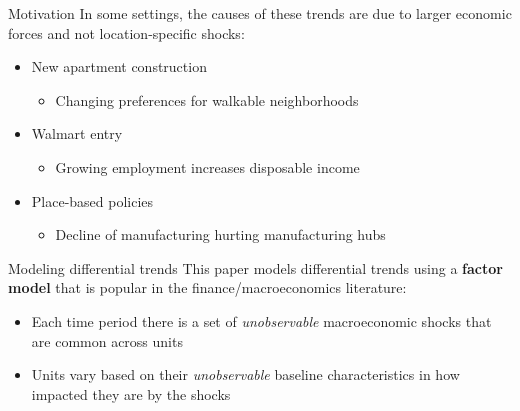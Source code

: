 \documentclass[aspectratio=169,t,11pt]{beamer}
\begin{document}
\begin{frame}{Motivation}
  In some settings, the causes of these trends are due to larger economic forces and not location-specific shocks:
  
  \begin{itemize}
    \item New apartment construction
    \begin{itemize}
      \item Changing preferences for walkable neighborhoods
    \end{itemize} 

    \pause
    \item Walmart entry
    \begin{itemize}
      \item Growing employment increases disposable income
    \end{itemize}

    \pause
    \item Place-based policies
    \begin{itemize}
      \item Decline of manufacturing hurting manufacturing hubs
    \end{itemize}
  \end{itemize}
\end{frame}

\begin{frame}{Modeling differential trends}
  This paper models differential trends using a \textbf{factor model} that is popular in the finance/macroeconomics literature:

  \begin{itemize}
    \item Each time period there is a set of \emph{unobservable} macroeconomic shocks that are common across units
    \item Units vary based on their \emph{unobservable} baseline characteristics in how impacted they are by the shocks
  \end{itemize} 
\end{frame}

% 
\end{document}
